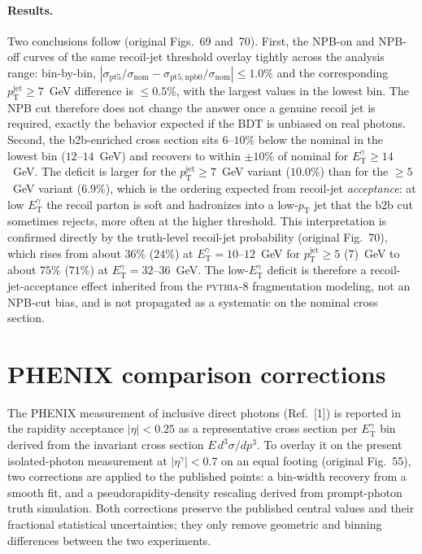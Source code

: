 \documentclass[11pt]{article}
\newcommand{\ETg}{E_{\mathrm{T}}^{\gamma}}
\newcommand{\pt}{p_{\mathrm{T}}}
\begin{document}
\paragraph{Results.} Two conclusions follow (original Figs.~69 and~70). First, the
NPB-on and NPB-off curves of the same recoil-jet threshold overlay tightly across
the analysis range: bin-by-bin,
$|\sigma_{\mathrm{pt5}}/\sigma_{\mathrm{nom}}-\sigma_{\mathrm{pt5,npb0}}/\sigma_{\mathrm{nom}}|\le1.0\%$
and the corresponding $p_{\mathrm{T}}^{\mathrm{jet}}\ge7$~GeV difference is
$\le0.5\%$, with the largest values in the lowest bin. The NPB cut therefore does
not change the answer once a genuine recoil jet is required, exactly the behavior
expected if the BDT is unbiased on real photons. Second, the b2b-enriched cross
section sits $6$--$10\%$ below the nominal in the lowest bin ($12$--$14$~GeV) and
recovers to within $\pm10\%$ of nominal for $\ETg\ge14$~GeV. The deficit is larger
for the $p_{\mathrm{T}}^{\mathrm{jet}}\ge7$~GeV variant ($10.0\%$) than for the
$\ge5$~GeV variant ($6.9\%$), which is the ordering expected from recoil-jet
\emph{acceptance}: at low $\ETg$ the recoil parton is soft and hadronizes into a
low-$\pt$ jet that the b2b cut sometimes rejects, more often at the higher
threshold. This interpretation is confirmed directly by the truth-level recoil-jet
probability (original Fig.~70), which rises from about $36\%$ ($24\%$) at
$\ETg=10$--$12$~GeV for $p_{\mathrm{T}}^{\mathrm{jet}}\ge5$ ($7$)~GeV to about
$75\%$ ($71\%$) at $\ETg=32$--$36$~GeV. The low-$\ETg$ deficit is therefore a
recoil-jet-acceptance effect inherited from the \textsc{pythia-8} fragmentation
modeling, not an NPB-cut bias, and is not propagated as a systematic on the
nominal cross section.

\section{PHENIX comparison corrections}
\label{app:phenix}
The PHENIX measurement of inclusive direct photons (Ref.~[1]) is reported in the
rapidity acceptance $|\eta|<0.25$ as a representative cross section per $\ETg$ bin
derived from the invariant cross section $E\,d^3\sigma/dp^3$. To overlay it on the
present isolated-photon measurement at $|\eta^{\gamma}|<0.7$ on an equal footing
(original Fig.~55), two corrections are applied to the published points: a
bin-width recovery from a smooth fit, and a pseudorapidity-density rescaling
derived from prompt-photon truth simulation. Both corrections preserve the
published central values and their fractional statistical uncertainties; they only
remove geometric and binning differences between the two experiments.
\end{document}
